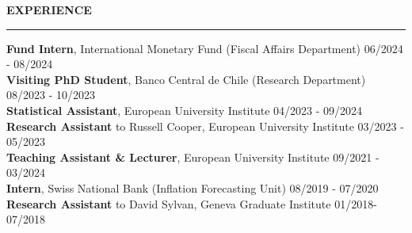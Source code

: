 \documentclass[letterpaper,11pt]{article}
\begin{document}
\vspace{0.5cm}
\textbf{EXPERIENCE}\\
\vspace{1mm} \hrule
\vspace{2mm}
\hspace{0.9cm} \textbf{Fund Intern}, International Monetary Fund (Fiscal Affairs Department) \hfill 06/2024 - 08/2024\\ \vspace{1mm}
\hspace{0.9cm} \textbf{Visiting PhD Student}, Banco Central de Chile (Research Department) \hfill 08/2023 - 10/2023\\ \vspace{1mm}
\hspace{0.9cm} \textbf{Statistical Assistant}, European University Institute \hfill 04/2023 - 09/2024\\ \vspace{1mm}
\hspace{0.9cm} \textbf{Research Assistant} to Russell Cooper, European University Institute \hfill 03/2023 - 05/2023\\ \vspace{1mm}
\hspace{0.9cm} \textbf{Teaching Assistant \& Lecturer}, European University Institute \hfill 09/2021 - 03/2024\\ \vspace{1mm}
\hspace{0.9cm} \textbf{Intern}, Swiss National Bank (Inflation Forecasting Unit) \hfill 08/2019 - 07/2020 \\ \vspace{1mm}
\hspace{0.9cm} \textbf{Research Assistant} to David Sylvan, Geneva Graduate Institute \hfill 01/2018-07/2018 \\ 
\end{document}
